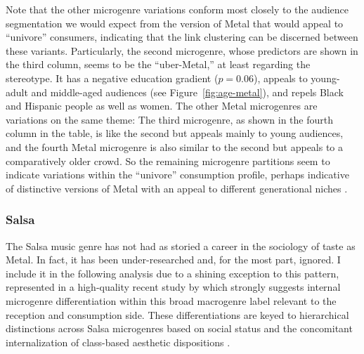 \documentclass[a4paper,12pt]{extarticle}
\begin{document}
Note that the other microgenre variations conform most closely to the audience segmentation we would expect from the version of Metal that would appeal to ``univore'' consumers, indicating that the link clustering can be discerned between these variants. Particularly, the second microgenre, whose predictors are shown in the third column, seems to be the ``uber-Metal,'' at least regarding the stereotype. It has a negative education gradient ($p = 0.06$), appeals to young-adult and middle-aged audiences (see Figure~\ref{fig:age-metal}), and repels Black and Hispanic people as well as women. The other Metal microgenres are variations on the same theme: The third microgenre, as shown in the fourth column in the table, is like the second but appeals mainly to young audiences, and the fourth Metal microgenre is also similar to the second but appeals to a comparatively older crowd. So the remaining microgenre partitions seem to indicate variations within the ``univore'' consumption profile, perhaps indicative of distinctive versions of Metal with an appeal to different generational niches \citep{koch2020evolutionary}. 

\subsubsection{Salsa}
The Salsa music genre has not had as storied a career in the sociology of taste as Metal. In fact, it has been under-researched and, for the most part, ignored. I include it in the following analysis due to a shining exception to this pattern, represented in a high-quality recent study by \citep{Bachmayer2014-pk} which strongly suggests internal microgenre differentiation within this broad macrogenre label relevant to the reception and consumption side. These differentiations are keyed to hierarchical distinctions across Salsa microgenres based on social status and the concomitant internalization of class-based aesthetic dispositions \citep{lizardo2012reconceptualizing}. 
\end{document}
